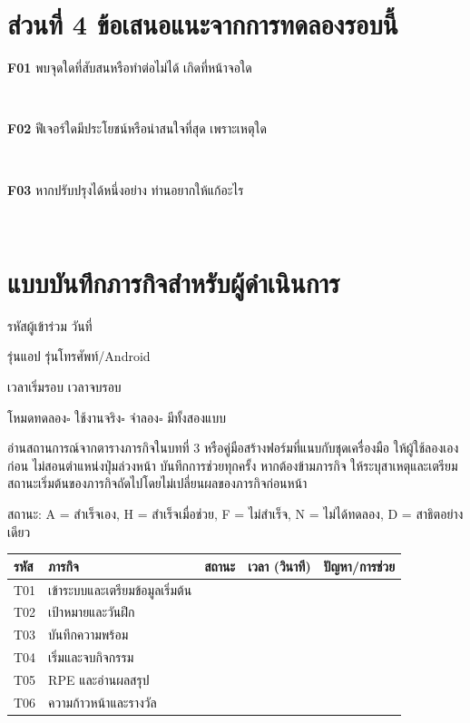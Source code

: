 \section*{ส่วนที่ 4 ข้อเสนอแนะจากการทดลองรอบนี้}

\noindent\textbf{F01} พบจุดใดที่สับสนหรือทำต่อไม่ได้ เกิดที่หน้าจอใด

\noindent\dotfill\\[0.5\baselineskip]\noindent\dotfill

\medskip
\noindent\textbf{F02} ฟีเจอร์ใดมีประโยชน์หรือน่าสนใจที่สุด เพราะเหตุใด

\noindent\dotfill\\[0.5\baselineskip]\noindent\dotfill

\medskip
\noindent\textbf{F03} หากปรับปรุงได้หนึ่งอย่าง ท่านอยากให้แก้อะไร

\noindent\dotfill\\[0.5\baselineskip]\noindent\dotfill

\clearpage
\section*{แบบบันทึกภารกิจสำหรับผู้ดำเนินการ}

\noindent รหัสผู้เข้าร่วม \dotfill\quad วันที่ \dotfill

\noindent รุ่นแอป \dotfill\quad รุ่นโทรศัพท์/Android \dotfill

\noindent เวลาเริ่มรอบ \dotfill\quad เวลาจบรอบ \dotfill

\noindent โหมดทดลอง\quad $\square$ ใช้งานจริง\quad $\square$ จำลอง\quad $\square$ มีทั้งสองแบบ

อ่านสถานการณ์จากตารางภารกิจในบทที่ 3 หรือคู่มือสร้างฟอร์มที่แนบกับชุดเครื่องมือ ให้ผู้ใช้ลองเองก่อน ไม่สอนตำแหน่งปุ่มล่วงหน้า บันทึกการช่วยทุกครั้ง หากต้องข้ามภารกิจ ให้ระบุสาเหตุและเตรียมสถานะเริ่มต้นของภารกิจถัดไปโดยไม่เปลี่ยนผลของภารกิจก่อนหน้า

\noindent สถานะ: A = สำเร็จเอง, H = สำเร็จเมื่อช่วย, F = ไม่สำเร็จ, N = ไม่ได้ทดลอง, D = สาธิตอย่างเดียว

\begingroup
\small
\setlength{\tabcolsep}{4pt}
\renewcommand{\arraystretch}{1.4}
\begin{longtable}{|>{\raggedright\arraybackslash}p{}|>{\raggedright\arraybackslash}p{}|>{\centering\arraybackslash}p{}|>{\centering\arraybackslash}p{}|>{\raggedright\arraybackslash}p{}|}
\hline
\textbf{รหัส} & \textbf{ภารกิจ} & \textbf{สถานะ} & \textbf{เวลา (วินาที)} & \textbf{ปัญหา/การช่วย} \\ \hline
T01 & เข้าระบบและเตรียมข้อมูลเริ่มต้น & & & \\[1.3\baselineskip] \hline
T02 & เป้าหมายและวันฝึก & & & \\[1.3\baselineskip] \hline
T03 & บันทึกความพร้อม & & & \\[1.3\baselineskip] \hline
T04 & เริ่มและจบกิจกรรม & & & \\[1.3\baselineskip] \hline
T05 & RPE และอ่านผลสรุป & & & \\[1.3\baselineskip] \hline
T06 & ความก้าวหน้าและรางวัล & & & \\[1.3\baselineskip] \hline
\end{longtable}
\endgroup

